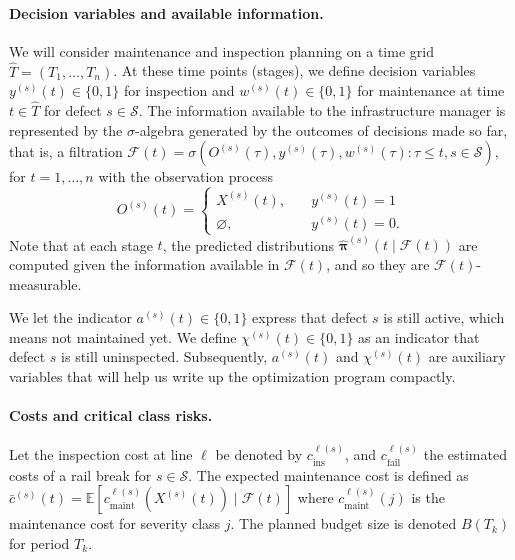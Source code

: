 \paragraph{Decision variables and available information.}
We will consider maintenance and inspection planning on a time grid $\widehat T=(T_1,\dots,T_n)$.
At these time points (stages), we define decision variables 
$y^{(s)}(t)\in\{0,1\}$ for inspection and $w^{(s)}(t)\in\{0,1\}$ for maintenance at time $t \in \widehat T$ for defect $s\in\mathcal S$.
The information available to the infrastructure manager is represented by the $\sigma$-algebra generated by the outcomes of decisions made so far, that is, a filtration
$
\mathcal F(t) = \sigma \left( O^{(s)}(\tau), y^{(s)}(\tau), w^{(s)}(\tau) : \tau \leq t, s\in\mathcal S \right), 
$
for $t = 1, \dots, n$ with the observation process 
$$
O^{(s)}(t) = \begin{cases}
X^{(s)}(t), \quad &y^{(s)}(t) = 1\\ 
\varnothing, \quad &y^{(s)}(t) = 0.
\end{cases}
$$
Note that at each stage $t$, the predicted distributions $\widehat{\bm \pi}^{(s)}(t \mid \mathcal F(t))$ are computed given the information available in $\mathcal F(t)$, and so they are $\mathcal F(t)$-measurable.

We let the indicator \(a^{(s)}(t)\in\{0,1\}\) express that defect \(s\) is still active, which means not maintained yet. We define \(\chi^{(s)}(t)\in\{0,1\}\) as an indicator that defect \(s\) is still uninspected. Subsequently, $a^{(s)}(t)$ and $\chi^{(s)}(t)$ are auxiliary variables that will help us write up the optimization program compactly.


\paragraph{Costs and critical class risks.}
Let the inspection cost at line $\ell$ be denoted by $c_{\text{ins}}^{\ell(s)}$, and $c_{\text{fail}}^{\ell(s)}$ the estimated costs of a rail break for $s \in \mathcal S$.
The expected maintenance cost is defined as 
$
\bar c^{(s)}(t) = \mathds E \left[ c_{\text{maint}}^{\ell(s)} \left(X^{(s)}(t)\right) \mid \mathcal F(t) \right]
$ where $c^{\ell(s)}_{\text{maint}}(j)$ is the maintenance cost for severity class $j$. The planned budget size is denoted $B(T_k)$ for period $T_k$.

